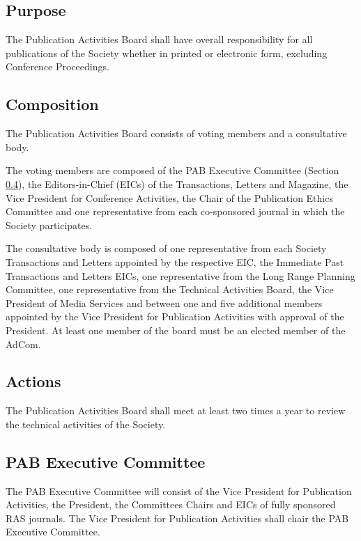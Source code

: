 \documentclass[10pt]{article}
\newcommand{\secref}[1]{Section \ref{#1}}
\begin{document}
\subsection{Purpose}
The Publication Activities Board shall have overall responsibility for all publications of the Society whether in printed or electronic form, excluding Conference Proceedings.  




\subsection{Composition}

The Publication Activities Board consists of voting members and a consultative body. 

The voting members are composed of the PAB Executive Committee (\secref{PAB:ExCom}), the Editors-in-Chief (EICs) of the Transactions, Letters and Magazine, the Vice President for Conference Activities, the Chair of the Publication Ethics Committee and one representative from each co-sponsored journal in which the Society participates. 

The consultative body is composed of one representative from each Society Transactions and Letters appointed by the respective EIC, the Immediate Past Transactions and Letters EICs, one representative from the Long Range Planning Committee, one representative from the Technical Activities Board, the Vice President of Media Services and between one and five additional  members appointed by the Vice President for Publication Activities with approval of the President. At least one member of the board must be an elected member of the AdCom.


\subsection{Actions}

The Publication Activities Board shall meet at least two times a year to review the technical activities of the Society.

\subsection{PAB Executive Committee}
\label{PAB:ExCom}

The PAB Executive Committee will consist of the Vice President for Publication Activities, the President, the Committees Chairs and EICs of fully sponsored RAS journals. The Vice President for Publication Activities shall chair the PAB Executive Committee.
\end{document}
